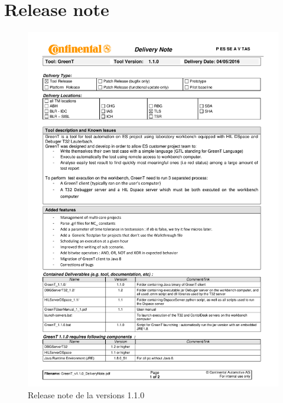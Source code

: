 \chapter{Release note}\label{releasenote}

\begin{figure}[H]
\centering
\includegraphics[width=13cm]{annexes/GreenT_v1-1-0_DeliveryNote.pdf} 
\caption{Release note de la versions 1.1.0}
\end{figure}